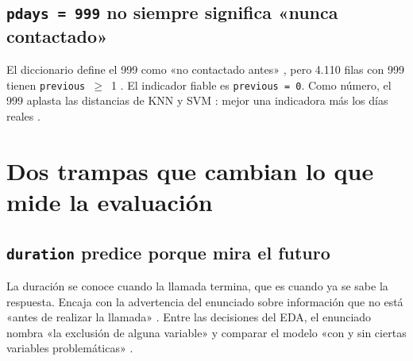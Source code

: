 \documentclass[10pt,a4paper]{article}
\begin{document}


\subsection{\texttt{pdays = 999} no siempre significa «nunca contactado»}
\noindent\begin{minipage}[t]{0.52\linewidth}\vspace{0pt}
\end{minipage}\hfill
\begin{minipage}[t]{0.44\linewidth}\vspace{4pt}
El diccionario define el 999 como «no contactado antes» , pero 4.110 filas con 999
tienen \texttt{previous}~$\geq$~1 . El indicador fiable es \texttt{previous = 0}. Como
número, el 999 aplasta las distancias de KNN y SVM : mejor una indicadora más los
días reales .
\end{minipage}

\newpage
\section{Dos trampas que cambian lo que mide la evaluación}\label{sec:trampas}

\subsection{\texttt{duration} predice porque mira el futuro}
\noindent\begin{minipage}[t]{0.52\linewidth}\vspace{0pt}
\end{minipage}\hfill
\begin{minipage}[t]{0.44\linewidth}\vspace{4pt}
La duración se conoce cuando la llamada termina, que es cuando ya se sabe la respuesta. Encaja con
la advertencia del enunciado sobre información que no está «antes de realizar la llamada»
 . Entre las decisiones del EDA, el enunciado nombra «la exclusión
de alguna variable» y comparar el modelo «con y sin ciertas variables problemáticas» .
\end{minipage}
\end{document}

